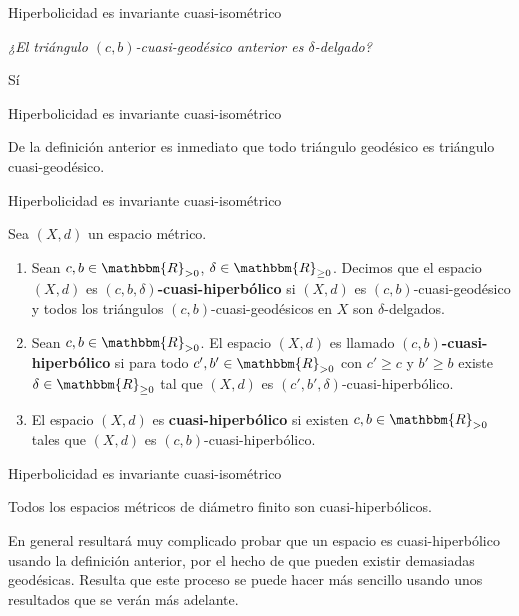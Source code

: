 \documentclass[xcolor=dvipsnames]{beamer}
\theoremstyle{largebreak}
\newcommand{\bbm}[1]{\ensuremath{\mathbbm{#1}}}
\begin{document}
\begin{frame}{Hiperbolicidad es invariante cuasi-isométrico}
    \begin{center}
        \Large \textit{¿El triángulo $(c,b)$-cuasi-geodésico anterior es $\delta$-delgado?}
        \pause
        
        Sí
    \end{center}    
\end{frame}

\begin{frame}{Hiperbolicidad es invariante cuasi-isométrico}
    \begin{obs}
        De la definición anterior es inmediato que todo triángulo geodésico es triángulo cuasi-geodésico.
    \end{obs}
\end{frame}

\begin{frame}{Hiperbolicidad es invariante cuasi-isométrico}
    \begin{mydef}
        Sea $(X,d)$ un espacio métrico.
        \begin{enumerate}[label = \textit{(\arabic*)}]
            \item Sean $c,b\in\bbm{R}_{>0}$, $\delta\in\bbm{R}_{\geq0}$. Decimos que el espacio $(X,d)$ es \textbf{$(c,b,\delta)$-cuasi-hiperbólico} si $(X,d)$ es $(c,b)$-cuasi-geodésico y todos los triángulos $(c,b)$-cuasi-geodésicos en $X$ son $\delta$-delgados.
            \item Sean $c,b\in\bbm{R}_{>0}$. El espacio $(X,d)$ es llamado \textbf{$(c,b)$-cuasi-hiperbólico} si para todo $c',b'\in\bbm{R}_{>0}$ con $c'\geq c$ y $b'\geq b$ existe $\delta\in\bbm{R}_{\geq0}$ tal que $(X,d)$ es $(c',b',\delta)$-cuasi-hiperbólico.
            \item El espacio $(X,d)$ es \textbf{cuasi-hiperbólico} si existen $c,b\in\bbm{R}_{>0}$ tales que $(X,d)$ es $(c,b)$-cuasi-hiperbólico.
        \end{enumerate}
    \end{mydef}
\end{frame}

\begin{frame}{Hiperbolicidad es invariante cuasi-isométrico}
    \begin{exa}
        Todos los espacios métricos de diámetro finito son cuasi-hiperbólicos.
    \end{exa}

    \begin{obs}
        En general resultará muy complicado probar que un espacio es cuasi-hiperbólico usando la definición anterior, por el hecho de que pueden existir demasiadas geodésicas. Resulta que este proceso se puede hacer más sencillo usando unos resultados que se verán más adelante.
    \end{obs}
\end{frame}
\end{document}
